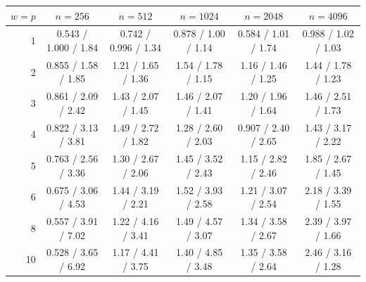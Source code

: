 \begin{tabular}{rccccc}
\toprule
$w=p$ & $n=256$ & $n=512$ & $n=1024$ & $n=2048$ & $n=4096$ \\
\midrule
1 & 0.543 / 1.000 / 1.84 & 0.742 / 0.996 / 1.34 & 0.878 / 1.00 / 1.14 & 0.584 / 1.01 / 1.74 & 0.988 / 1.02 / 1.03 \\
2 & 0.855 / 1.58 / 1.85 & 1.21 / 1.65 / 1.36 & 1.54 / 1.78 / 1.15 & 1.16 / 1.46 / 1.25 & 1.44 / 1.78 / 1.23 \\
3 & 0.861 / 2.09 / 2.42 & 1.43 / 2.07 / 1.45 & 1.46 / 2.07 / 1.41 & 1.20 / 1.96 / 1.64 & 1.46 / 2.51 / 1.73 \\
4 & 0.822 / 3.13 / 3.81 & 1.49 / 2.72 / 1.82 & 1.28 / 2.60 / 2.03 & 0.907 / 2.40 / 2.65 & 1.43 / 3.17 / 2.22 \\
5 & 0.763 / 2.56 / 3.36 & 1.30 / 2.67 / 2.06 & 1.45 / 3.52 / 2.43 & 1.15 / 2.82 / 2.46 & 1.85 / 2.67 / 1.45 \\
6 & 0.675 / 3.06 / 4.53 & 1.44 / 3.19 / 2.21 & 1.52 / 3.93 / 2.58 & 1.21 / 3.07 / 2.54 & 2.18 / 3.39 / 1.55 \\
8 & 0.557 / 3.91 / 7.02 & 1.22 / 4.16 / 3.41 & 1.49 / 4.57 / 3.07 & 1.34 / 3.58 / 2.67 & 2.39 / 3.97 / 1.66 \\
10 & 0.528 / 3.65 / 6.92 & 1.17 / 4.41 / 3.75 & 1.40 / 4.85 / 3.48 & 1.35 / 3.58 / 2.64 & 2.46 / 3.16 / 1.28 \\
\bottomrule
\end{tabular}
\par{}
